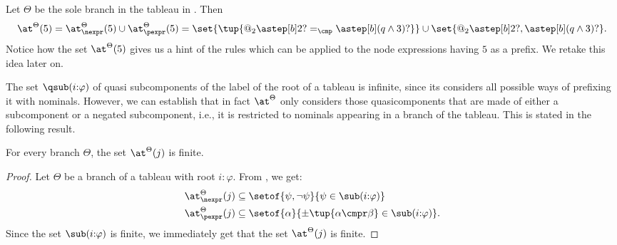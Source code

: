 \begin{exa} 
  \label{ex:at}
  Let $\Theta$ be the sole branch in the tableau in .
  Then
$$	      \at^{\Theta}(5) =       {\at_{\nexpr}^{\Theta}(5) \cup \at_{\pexpr}^{\Theta}(5)} =	      {\set{\tup{@_2\astep[b]2? =_\cmp \astep[b](q \land 3)?}} \cup \set{@_2\astep[b]2?,\astep[b](q\land 3)?}}.$$
  Notice how the set $\at^{\Theta}(5)$ gives us a hint of the rules which can be applied to the node expressions having $5$ as a prefix. 
  We retake this idea later on.
\end{exa}

The set $\qsub(i{:}\varphi)$ of quasi subcomponents of the label of the root of a tableau is infinite, since its considers all possible ways of prefixing it with nominals.
However, we can establish that in fact $\at^\Theta$ only considers those  quasicomponents that are made of either a subcomponent or a negated subcomponent, i.e., it is restricted to nominals appearing in a branch of the tableau. This is stated in the following result.

\begin{prop} \label{prop:at:finite}
  For every branch $\Theta$, the set $\at^\Theta(j)$ is finite.
\end{prop}
\begin{proof}
  Let $\Theta$ be a branch of a tableau with root $i{:} \varphi$.
  From , we get: 
  \begin{align*}
    {\at^{\Theta}_{\nexpr}}(j)
      & \subseteq  \setof{\psi, \lnot \psi}{\psi \in \sub(i{:}\varphi) } 
    \\
    \at^{\Theta}_{\pexpr}(j)
      & \subseteq \setof{\alpha}{{\pm}\tup{\alpha \cmpr \beta} \in \sub(i{:}\varphi)}.
  \end{align*}
  Since the set $\sub(i{:}\varphi)$ is finite, we immediately get that the set $\at^\Theta(j)$ is finite.
\end{proof}

